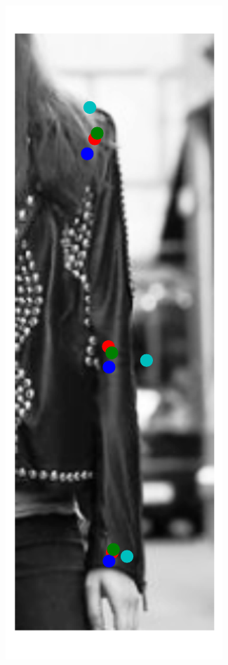 \begin{figure}[t!]
\begin{subfigure}[b]{0.05\textwidth}
    \end{subfigure}
    \hfill
    \begin{subfigure}[b]{0.05\textwidth}
            \includegraphics[width=\textwidth]{resources/Fig_Variance/image_6}

\end{subfigure}
\end{figure}
